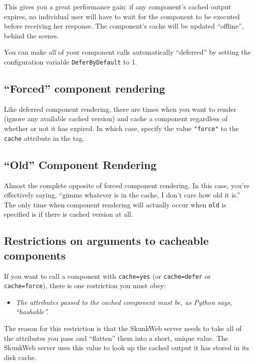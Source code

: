 \documentclass{manual}
\begin{document}
{{This gives you a great performance gain: if any component's cached
output expires, no individual user will have to wait for the component
to be executed before receiving her response. The component's cache
will be updated ``offline'', behind the scenes.

You can make all of your component calls automatically ``deferred'' by
setting the configuration variable
\texttt{DeferByDefault} to 1.

\subsection{``Forced'' component rendering}
Like deferred component rendering, there are times when you want to
render (ignore any available cached version) and cache a component
regardless of whether or not it has expired.  In which case, specify
the value \texttt{"force"} to the \texttt{cache} attribute in the tag.

\subsection{``Old'' Component Rendering}
Almost the complete opposite of forced component rendering.  In this
case, you're effectively saying, ``gimme whatever is in the cache, I
don't care how old it is.''  The only time when component rendering
will actually occur when \texttt{old} is specified is if there is
 cached version at all.

\subsection{Restrictions on arguments to cacheable components}
\label{tagcomponentrestrictions}

If you want to call a component with \texttt{cache=yes} (or
\texttt{cache=defer} or \texttt{cache=force}), there is one
restriction you must obey:

\begin{itemize}
\item \emph{The attributes passed to the cached component must be, 
as Python says, ``hashable''.}
\end{itemize}

The reason for this restriction is that the SkunkWeb server 
needs to take all of the attributes you pass and ``flatten''
them into a short, unique value. The SkunkWeb server uses 
this value to look up the cached output it has stored in 
its disk cache.

}}
\end{document}
